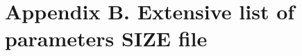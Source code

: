 \documentclass[11pt]{report}              %
\begin{document}
\section{Appendix B. Extensive list of parameters SIZE file}

%
\begin{comment} 
\part{Developer's manual}                   %
\chapter{Spectral element method}
\section{Weak formulation of Navier-Stokes}
\section{Passive scalar}

\chapter{Time discretisation}
\section{Time integration methods}
\section{Splitting methods}
\section{PN-PN}
%
\subsection{Pressure splitting}
\section{PN-PN-2}
\begin{comment}
\section{Domain decomposition}
\chapter{Algebraic solver}

\end{comment}
\end{document}
